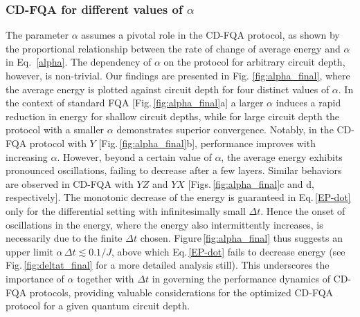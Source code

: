 \documentclass[twocolumn,aps,superscriptaddress,floatfix,longbibliography]{revtex4-2}
\newcommand{\Eq}[1]{Eq.\,\eqref{#1}}
\newcommand{\FIG}[1]{Figure\,\ref{fig:#1}}
\newcommand{\Fig}[1]{Fig.\,\ref{fig:#1}}
\newcommand{\Figs}[1]{Figs.\,\ref{fig:#1}}
\begin{document}
\subsubsection{CD-FQA for different values of $\alpha$}
The parameter $\alpha$ assumes a pivotal role in the CD-FQA protocol, as shown by the proportional relationship between the rate of change of average energy and $\alpha$ in Eq.~\ref{alpha}. The dependency of $\alpha$ on the protocol for arbitrary circuit depth, however, is non-trivial. Our findings are presented in Fig. \ref{fig:alpha_final}, where the average energy is plotted against circuit depth for four distinct values of $\alpha$.
In the context of standard FQA
[\Fig{alpha_final}a] %
a larger $\alpha$ induces a rapid reduction in energy for shallow circuit depths, while for large circuit depth the protocol with a smaller $\alpha$ demonstrates superior convergence. Notably, in the CD-FQA protocol with $Y$
[\Fig{alpha_final}b],
performance improves with increasing $\alpha$. However, beyond a certain value %
of $\alpha$, the average energy exhibits pronounced oscillations, failing to decrease after a few layers. 
Similar behaviors are observed in CD-FQA with $YZ$ and $YX$
[\Figs{alpha_final}c and d, respectively].
The monotonic decrease of the energy
is guaranteed in \Eq{EP-dot} only for the differential
setting with infinitesimally small $\Delta t$.
Hence the onset of oscillations in the energy, where
the energy also intermittently increases, is necessarily
due to the finite $\Delta t$ chosen.
\FIG{alpha_final} thus suggests an upper limit
$\alpha \, \Delta t \lesssim 0.1/J$, above which
\Eq{EP-dot} fails to decrease energy (see \Fig{deltat_final}
for a more detailed analysis still). This
underscores the importance of $\alpha$ 
together with $\Delta t$
in governing the performance dynamics of CD-FQA protocols, providing valuable considerations for the optimized CD-FQA protocol for a given quantum circuit depth.
\end{document}
